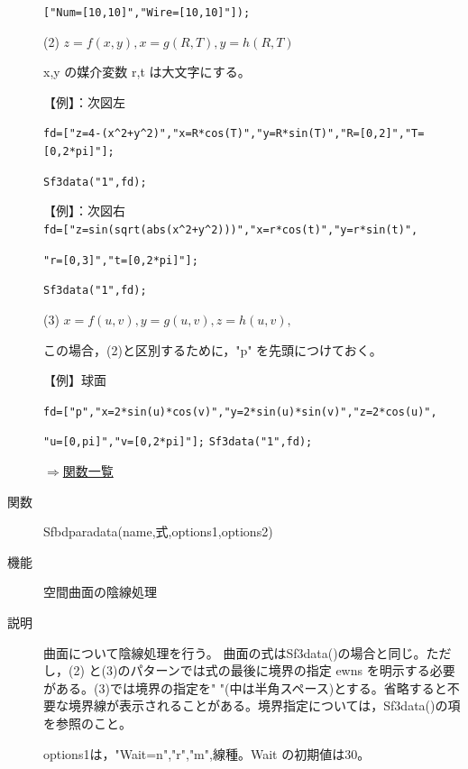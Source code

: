 \documentclass[papersize,a4paper,12pt,uplatex]{jsarticle}
\begin{document}
\begin{description}
\verb|["Num=[10,10]","Wire=[10,10]"]);|
  
\vspace{\baselineskip}
(2) $z=f(x,y),x=g(R,T),y=h(R,T)$

 x,y の媒介変数 r,t は大文字にする。
    
\vspace{\baselineskip}
【例】：次図左
  
\verb|fd=["z=4-(x^2+y^2)","x=R*cos(T)","y=R*sin(T)","R=[0,2]","T=[0,2*pi]"];|

 \verb|Sf3data("1",fd);|
    
【例】：次図右\\
 \verb|fd=["z=sin(sqrt(abs(x^2+y^2)))","x=r*cos(t)","y=r*sin(t)",|

\verb|"r=[0,3]","t=[0,2*pi]"];|
 
\verb|Sf3data("1",fd);|

  \begin{center}     \end{center}

(3) $x=f(u,v),y=g(u,v),z=h(u,v),$

  この場合，(2)と区別するために，"p" を先頭につけておく。
  
 \vspace{\baselineskip}
 【例】球面
 
 \verb|fd=["p","x=2*sin(u)*cos(v)","y=2*sin(u)*sin(v)","z=2*cos(u)",|
    
\verb|"u=[0,pi]","v=[0,2*pi]"];|
\verb|Sf3data("1",fd);|

\begin{center}  \end{center}

\begin{flushright} \hyperlink{functionlist}{$\Rightarrow$関数一覧}\end{flushright}

\hypertarget{sfbdparadata}{}
\item[関数]  Sfbdparadata(name,式,options1,options2)
\item[機能]  空間曲面の陰線処理
\item[説明]  曲面について陰線処理を行う。
  曲面の式はSf3data()の場合と同じ。ただし，(2) と(3)のパターンでは式の最後に境界の指定 ewns を明示する必要がある。(3)では境界の指定を" "(中は半角スペース)とする。省略すると不要な境界線が表示されることがある。境界指定については，Sf3data()の項を参照のこと。
  
options1は，"Wait=n","r","m",線種。Wait の初期値は30。


\end{description}
\end{document}
